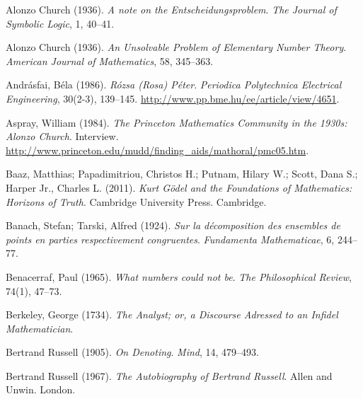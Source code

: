 \par\medskip{}\label{bib:Church1936}
Alonzo Church (1936). \emph{A note on the {E}ntscheidungsproblem}. \emph{The Journal of Symbolic Logic}, 1, 40--41.

\par\medskip{}\label{bib:Church1936a}
Alonzo Church (1936). \emph{An Unsolvable Problem of Elementary Number Theory}. \emph{American Journal of Mathematics}, 58, 345--363.

\par\medskip{}\label{bib:Andrasfai1986}
Andr\'asfai, B\'ela (1986). \emph{R\'ozsa ({R}osa) {P}\'eter}. \emph{Periodica Polytechnica Electrical Engineering}, 30(2-3), 139--145. \url{http://www.pp.bme.hu/ee/article/view/4651}.

\par\medskip{}\label{bib:Aspray1984}
Aspray, William (1984). \emph{The {P}rinceton Mathematics Community in the 1930s: {A}lonzo {C}hurch}. Interview. \url{http://www.princeton.edu/mudd/finding_aids/mathoral/pmc05.htm}.

\par\medskip{}\label{bib:Baaz2011}
Baaz, Matthias; Papadimitriou, Christos H.; Putnam, Hilary W.; Scott, Dana S.; Harper Jr., Charles L. (2011). \emph{Kurt {G}\"odel and the Foundations of Mathematics: Horizons of Truth}. Cambridge University Press. Cambridge.

\par\medskip{}\label{bib:BanachTarski1924}
Banach, Stefan; Tarski, Alfred (1924). \emph{Sur la d\'{e}composition des ensembles de points en parties respectivement congruentes}. \emph{Fundamenta Mathematicae}, 6, 244--77.

\par\medskip{}\label{bib:Benacerraf1965}
Benacerraf, Paul (1965). \emph{What numbers could not be}. \emph{The Philosophical Review}, 74(1), 47--73.

\par\medskip{}\label{bib:Berkeley1734}
Berkeley, George (1734). \emph{The Analyst; or, a Discourse Adressed to an Infidel Mathematician}.

\par\medskip{}\label{bib:Russell1905}
Bertrand Russell (1905). \emph{On Denoting}. \emph{Mind}, 14, 479--493.

\par\medskip{}\label{bib:Russell1967}
Bertrand Russell (1967). \emph{The Autobiography of Bertrand Russell}. Allen and Unwin. London.

